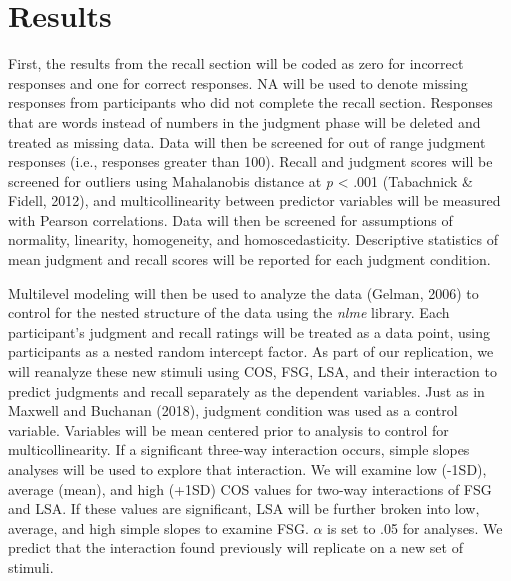 \documentclass[english,man]{apa6}
\theoremstyle{definition}
\theoremstyle{definition}
\theoremstyle{definition}
\theoremstyle{remark}
\begin{document}
\section{Results}\label{results}

First, the results from the recall section will be coded as zero for
incorrect responses and one for correct responses. NA will be used to
denote missing responses from participants who did not complete the
recall section. Responses that are words instead of numbers in the
judgment phase will be deleted and treated as missing data. Data will
then be screened for out of range judgment responses (i.e., responses
greater than 100). Recall and judgment scores will be screened for
outliers using Mahalanobis distance at \emph{p} \textless{} .001
(Tabachnick \& Fidell, 2012), and multicollinearity between predictor
variables will be measured with Pearson correlations. Data will then be
screened for assumptions of normality, linearity, homogeneity, and
homoscedasticity. Descriptive statistics of mean judgment and recall
scores will be reported for each judgment condition.

Multilevel modeling will then be used to analyze the data (Gelman, 2006)
to control for the nested structure of the data using the \emph{nlme}
library. Each participant's judgment and recall ratings will be treated
as a data point, using participants as a nested random intercept factor.
As part of our replication, we will reanalyze these new stimuli using
COS, FSG, LSA, and their interaction to predict judgments and recall
separately as the dependent variables. Just as in Maxwell and Buchanan
(2018), judgment condition was used as a control variable. Variables
will be mean centered prior to analysis to control for
multicollinearity. If a significant three-way interaction occurs, simple
slopes analyses will be used to explore that interaction. We will
examine low (-1SD), average (mean), and high (+1SD) COS values for
two-way interactions of FSG and LSA. If these values are significant,
LSA will be further broken into low, average, and high simple slopes to
examine FSG. \(\alpha\) is set to .05 for analyses. We predict that the
interaction found previously will replicate on a new set of stimuli.
\end{document}
